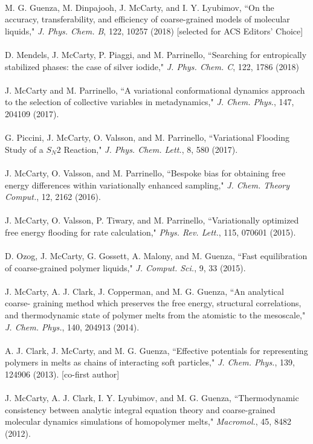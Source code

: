 \documentclass[10pt]{article} %
\begin{document}
\\
M. G. Guenza, M. Dinpajooh, J. McCarty, and I. Y. Lyubimov, ``On the accuracy, transferability, and efficiency of coarse-grained models of molecular liquids," {\it J. Phys. Chem. B}, 122, 10257 (2018) [selected for ACS Editors' Choice]  \\
\\
D. Mendels, J. McCarty, P. Piaggi, and M. Parrinello, ``Searching for entropically stabilized phases: the case of silver iodide," {\it J. Phys. Chem. C}, 122, 1786 (2018) \\
\\
J. McCarty and M. Parrinello, ``A variational conformational dynamics approach to the selection of collective variables in metadynamics," {\it J. Chem. Phys.}, 147, 204109 (2017). \\
\\
G. Piccini, J. McCarty, O. Valsson, and M. Parrinello, ``Variational Flooding Study of a $S_N2$ Reaction," {\it J. Phys. Chem. Lett.},  8, 580 (2017).\\
\\
J. McCarty, O. Valsson, and M. Parrinello, ``Bespoke bias for obtaining free energy differences within variationally enhanced sampling," {\it J. Chem. Theory Comput.}, 12, 2162 (2016). \\
\\
J. McCarty, O. Valsson, P. Tiwary, and M. Parrinello, ``Variationally optimized free energy flooding for rate calculation," {\it Phys. Rev. Lett.}, 115, 070601 (2015). \\
\\
D. Ozog, J. McCarty, G. Gossett, A. Malony, and M. Guenza, ``Fast equilibration of coarse-grained polymer liquids," {\it J. Comput. Sci.}, 9, 33 (2015).\\
\\
J. McCarty, A. J. Clark, J. Copperman, and M. G. Guenza, ``An analytical coarse- graining method which preserves the free energy, structural correlations, and thermodynamic state of polymer melts from the atomistic to the mesoscale," {\it J. Chem. Phys.}, 140, 204913 (2014). \\
\\
A. J. Clark, J. McCarty, and M. G. Guenza, ``Effective potentials for representing polymers in melts as chains of interacting soft particles," {\it J. Chem. Phys.}, 139, 124906 (2013). [co-first author] \\
\\
J. McCarty, A. J. Clark, I. Y. Lyubimov, and M. G. Guenza, ``Thermodynamic consistency between analytic integral equation theory and coarse-grained molecular dynamics simulations of homopolymer melts," {\it Macromol.}, 45, 8482 (2012). \\
\end{document}
